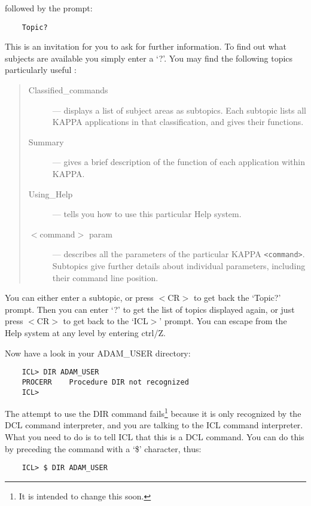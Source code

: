 followed by the prompt:

\begin{small}
\begin{verbatim}
    Topic?
\end{verbatim}
\end{small}

This is an invitation for you to ask for further information.
To find out what subjects are available you simply enter a `?'.
You may find the following topics particularly useful :
\begin{quote}
\begin{description}
\item [Classified\_commands] --- displays a list of subject areas as subtopics.
Each subtopic lists all KAPPA applications in that classification, and gives
their functions.
\item [Summary] --- gives a brief description of the function of each 
application within KAPPA.
\item [Using\_Help] --- tells you how to use this particular Help system.
\item [$<$command$>$ param] --- describes all the parameters of the particular
KAPPA  {\tt <command>}.
Subtopics give further details about individual parameters, including their
command line position.
\end{description}
\end{quote}
You can either enter a subtopic, or press $<$CR$>$ to get back the `Topic?'
prompt.
Then you can enter `?' to get the list of topics displayed again, or just
press $<$CR$>$ to get back to the `ICL$>$' prompt.
You can escape from the Help system at any level by entering ctrl/Z.

Now have a look in your ADAM\_USER directory:

\begin{small}
\begin{verbatim}
    ICL> DIR ADAM_USER
    PROCERR    Procedure DIR not recognized
    ICL>
\end{verbatim}
\end{small}

The attempt to use the DIR command fails\footnote{It is intended to change 
this soon.} because it is only recognized by the DCL command interpreter, and
you are talking to the ICL command interpreter.
What you need to do is to tell ICL that this is a DCL command.
You can do this by preceding the command with a `\$' character, thus:

\begin{small}
\begin{verbatim}
    ICL> $ DIR ADAM_USER
\end{verbatim}
\end{small}

